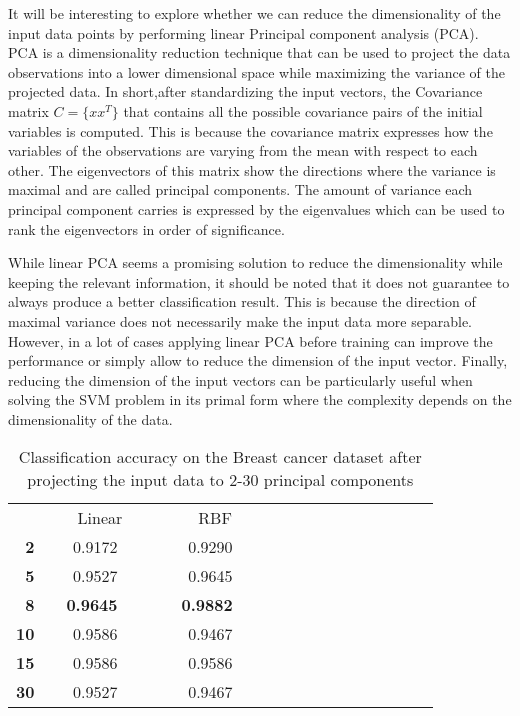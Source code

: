 \documentclass[conference,compsoc]{IEEEtran}
\begin{document}
It will be interesting to explore whether we can reduce the dimensionality of the input data points by performing linear Principal component analysis (PCA). PCA is a dimensionality reduction technique that can be used to project the data observations into a lower dimensional space while maximizing the variance of the projected data. In short,after standardizing the input vectors, the Covariance matrix $C=\{xx^T\}$ that contains all the possible covariance pairs of the initial variables is computed. This is because the covariance matrix expresses how the variables of the observations are varying from the mean with respect to each other. The eigenvectors of this matrix show the directions where the variance is maximal and are called principal components. The amount of variance each principal component carries is expressed by the eigenvalues which can be used to rank the eigenvectors in order of significance. 



While linear PCA seems a promising solution to reduce the dimensionality while keeping the relevant information, it should be noted that it does not guarantee to always produce a better classification result. This is because the direction of maximal variance does not necessarily make the input data more separable. However, in a lot of cases applying linear PCA before training can improve the performance or simply allow to reduce the dimension of the input vector. Finally, reducing the dimension of the input vectors can be particularly useful when solving the SVM problem in its primal form where the complexity depends on the dimensionality of the data.
\begin{table}\centering
\begin{tabular}{@{}rrrrrrrrrrccrrrcrrr@{}}\toprule
& \multicolumn{4}{c}{Linear} & \phantom{abc}& \multicolumn{2}{c}{RBF} &
\phantom{abc} \\

 \textbf{2}&   &     0.9172&   &&  &0.9290 &  \\
  \textbf{5}&   &  0.9527 &   &&  &     0.9645 &  \\
   \textbf{8}&   &  \textbf{0.9645} &   &&  &   \textbf{ 0.9882} &  \\
    \textbf{10}&   & 0.9586 &   &&  &  0.9467&  \\
    \textbf{15}&   &  0.9586 &   &&  &   0.9586 &  \\
    \textbf{30}&   &  0.9527 &   &&  &  0.9467 &  \\


\bottomrule
\end{tabular}
\caption{Classification accuracy on the Breast cancer dataset after projecting the input data to 2-30 principal components}
       \label{fig:brtable}

\end{table} 
 
\end{document}
